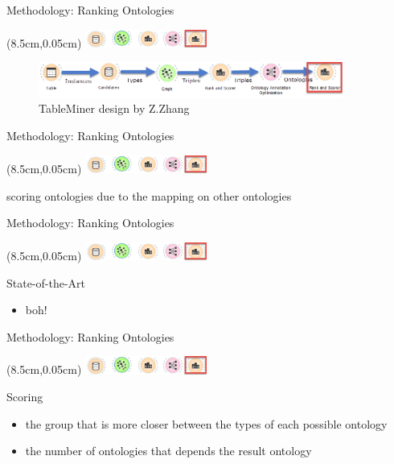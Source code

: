 \documentclass{beamer}
\begin{document}
\begin{frame}{Methodology: Ranking Ontologies}
	\begin{textblock*}{4cm}(8.5cm,0.05cm) %
		\includegraphics[width=4cm]{images/header-rank-ontologies.png}
	\end{textblock*}
	\begin{figure}
		\includegraphics[width=10cm]{images/diagrams-rank-ontologies.png}
		\caption{\label{fig:your-figure2} TableMiner design by Z.Zhang}
	\end{figure}
\end{frame}
\begin{frame}{Methodology: Ranking Ontologies}
	\begin{textblock*}{4cm}(8.5cm,0.05cm) %
		\includegraphics[width=4cm]{images/header-rank-ontologies.png}
	\end{textblock*}
	\begin{definition}
		scoring ontologies due to the mapping on other ontologies
	\end{definition}
\end{frame}
\begin{frame}{Methodology: Ranking Ontologies}
	\begin{textblock*}{4cm}(8.5cm,0.05cm) %
		\includegraphics[width=4cm]{images/header-rank-ontologies.png}
	\end{textblock*}
	State-of-the-Art
	\begin{itemize}
		\item boh!
	\end{itemize}
\end{frame}
\begin{frame}{Methodology: Ranking Ontologies}
	\begin{textblock*}{4cm}(8.5cm,0.05cm) %
		\includegraphics[width=4cm]{images/header-rank-ontologies.png}
	\end{textblock*}
	Scoring
	\begin{itemize}
		\item the group that is more closer between the types of each possible ontology
		\item the number of ontologies that depends the result ontology
	\end{itemize}
\end{frame}
\end{document}
